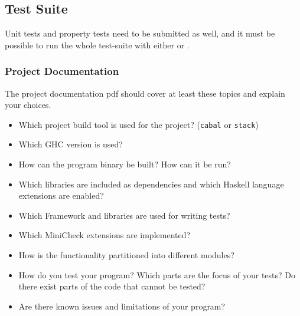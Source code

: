 \documentclass{article}
\begin{document}
\subsection{Test Suite}

Unit tests and property tests need to be submitted as well, and it must be possible to run the whole test-suite with either  or .

\subsubsection{Project Documentation}

The project documentation pdf should cover at least these topics and explain your choices.
\begin{itemize}
\item Which project build tool is used for the project? (\texttt{cabal} or \texttt{stack})
\item Which GHC version is used?
\item How can the program binary be built? How can it be run?
\item Which libraries are included as dependencies and which Haskell language extensions are enabled?
\item Which Framework and libraries are used for writing tests?
\item Which MiniCheck extensions are implemented?
\item How is the functionality partitioned into different modules?
\item How do you test your program? Which parts are the focus of your tests? Do there exist parts of the code that cannot be tested?
\item Are there known issues and limitations of your program?
\end{itemize}

\vspace*{1cm}

\printbibliography
\end{document}
